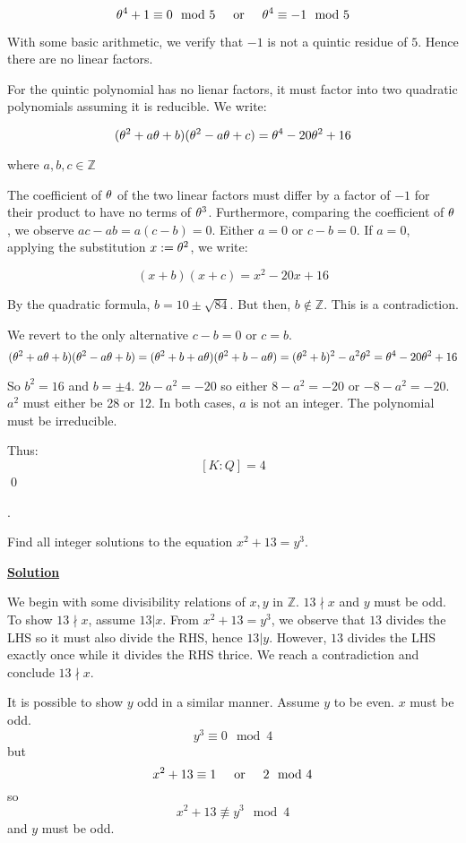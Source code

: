 \documentclass{article}
\newcommand{\new}[1]{
    \vspace{2mm}
    \noindent
    \textbf{
    \underline{#1}}
}
\def\ZZ{{\mathbb{Z}}}
\newcounter{problemcnt}
\newcommand{\Problem}{{
    \vspace{5mm}
    \stepcounter{problemcnt}
    \noindent
    \arabic{problemcnt}. 
}
}
\newcommand{\textOr}{
    \hspace{5mm}
    \textrm{or}
    \hspace{5mm}
}
\newcommand{\<}{{{
    \langle
}}}
\def\ZZ{{\mathbb{Z}}}
\begin{document}
\[
    \The^4 + 1 \equiv 0 \mod 5
    \textOr 
    \The^4 \equiv -1 \mod 5
\]

With some basic arithmetic, we verify that $-1$ is not a 
quintic residue of $5$. Hence there are no linear factors. 

For the quintic polynomial has no lienar factors, it must 
factor into two quadratic polynomials assuming it is reducible. 
We write:

\[
    ({\theta}^2+ a{\theta} + b)({\theta}^2 -a{\theta} + c) =   {\theta}^4 -20{\theta}^2 + 16
\]

where $a, b, c \in \ZZ$

The coefficient of ${\theta}$ of the two linear factors must differ by 
a factor of $-1$ for their product to have no terms of ${\theta}^3$. 
Furthermore, comparing the coefficient of ${\theta}$, we observe 
$ac -ab = a(c-b)= 0$. Either $a = 0$ or $c-b = 0$. If $a = 0$, 
applying the substitution $x := {\theta}^2$, we write:

\[
    (x+b)(x+c) = x^2-20x+16
\]

By the quadratic formula, $b = 10 \pm \sqrt{84}$. But then, 
$b \not\in \ZZ$. This is a contradiction. 

We revert to the only alternative $c-b = 0$ or $c = b$. 
\[
  ({\theta}^2+ a{\theta} + b)({\theta}^2 -a{\theta} + b)
  =
  ({\theta}^2+ b + a{\theta}) ({\theta}^2+ b - a{\theta})  
  = ({\theta}^2 + b)^2 - a^2{\theta} ^2
  = {\theta}^4 -20{\theta}^2 + 16
\]

So $b^2 = 16$ and $b = \pm 4$. $2b - a^2 = -20$ so 
either $8-a^2 = -20$ or $-8 - a^2 = -20$. $a^2$ must 
either be 28 or 12. In both cases, $a$ is not an integer. 
The polynomial must be irreducible. 

Thus:
\[
    [K:Q] = 4
\]
\qed

\newpage 


\Problem 
Find all integer solutions to the equation 
$x^2+13 = y^3$.

\new{Solution}
We begin with some divisibility relations of $x, y$ in $\ZZ$. 
$13 \nmid x$ and $y$ must be odd. To show $13 \nmid x$, assume 
$13 | x$. From $x^2+13 = y^3$, we observe that $13$ divides the 
LHS so it must also divide the RHS, hence $13|y$. However, $13$ 
divides the LHS exactly once while it divides the RHS thrice. 
We reach a contradiction and conclude $13 \nmid x$. 

It is possible to show $y$ odd in a similar manner. Assume $y$ 
to be even. $x$ must be odd. 
\[y^3 \equiv 0 \mod 4\]
 but 
 \[
    x^2 + 13 \equiv 1 \textOr 2 \mod 4
 \]
so
\[
    x^2+13 \not\equiv y^3 \mod 4
\]
and $y$ must be odd. 
\end{document}
